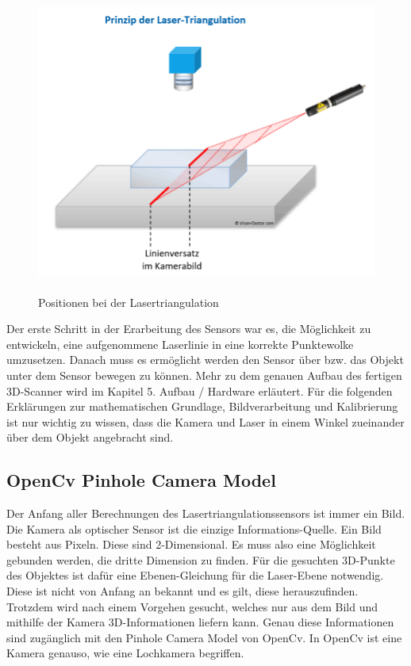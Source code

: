 	\begin{figure}[h]
		\centering
		\includegraphics[height=10cm]{img/grundlagen/lasertriangulation_2}
		\caption{Positionen bei der Lasertriangulation}
		\label{lasertriangulation}
	\end{figure}
	
	Der erste Schritt in der Erarbeitung des Sensors war es, die Möglichkeit zu entwickeln, eine aufgenommene Laserlinie in eine korrekte Punktewolke umzusetzen. Danach muss es ermöglicht werden den Sensor über bzw. das Objekt unter dem Sensor bewegen zu können. Mehr zu dem genauen Aufbau des fertigen 3D-Scanner wird im Kapitel 5. Aufbau / Hardware erläutert. Für die folgenden Erklärungen zur mathematischen Grundlage, Bildverarbeitung und Kalibrierung ist nur wichtig zu wissen, dass die Kamera und Laser in einem Winkel zueinander über dem Objekt angebracht sind. 
	
	\subsection{OpenCv Pinhole Camera Model}
	Der Anfang aller Berechnungen des Lasertriangulationssensors ist immer ein Bild. Die Kamera als optischer Sensor ist die einzige Informations-Quelle. Ein Bild besteht aus Pixeln. Diese sind 2-Dimensional. Es muss also eine Möglichkeit gebunden werden, die dritte Dimension zu finden. Für die gesuchten 3D-Punkte des Objektes ist dafür eine Ebenen-Gleichung für die Laser-Ebene notwendig. Diese ist nicht von Anfang an bekannt und es gilt, diese herauszufinden. Trotzdem wird nach einem Vorgehen gesucht, welches nur aus dem Bild und mithilfe der Kamera 3D-Informationen liefern kann. Genau diese Informationen sind zugänglich mit den Pinhole Camera Model von OpenCv. In OpenCv ist eine Kamera genauso, wie eine Lochkamera begriffen.
	
